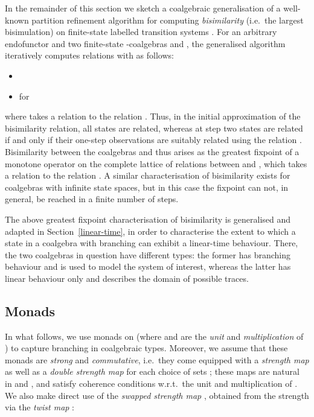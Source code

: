 \documentclass[submission,copyright,creativecommons]{eptcs}
\theoremstyle{plain}\newtheorem{theorem}{Theorem}[section]
\theoremstyle{remark}
\begin{document}
In the remainder of this section we sketch a coalgebraic generalisation of a well-known partition refinement algorithm for computing \emph{bisimilarity} (i.e.~the largest bisimulation) on finite-state labelled transition systems \cite{KS90}. For an arbitrary endofunctor  and two finite-state -coalgebras  and , the generalised algorithm iteratively computes relations  with  as follows:
\begin{itemize}
\item 
\item  for 
\end{itemize}
where  takes a relation  to the relation . Thus, in the initial approximation  of the bisimilarity relation, all states are related, whereas at step  two states are related if and only if their one-step observations are suitably related using the relation . Bisimilarity between the coalgebras  and  thus arises as the greatest fixpoint of a monotone operator on the complete lattice of relations between  and , which takes a relation  to the relation . A similar characterisation of bisimilarity exists for coalgebras with infinite state spaces, but in this case the fixpoint can not, in general, be reached in a finite number of steps.

The above greatest fixpoint characterisation of bisimilarity is generalised and adapted in Section~\ref{linear-time}, in order to characterise the extent to which a state in a coalgebra with branching can exhibit a linear-time behaviour. There, the two coalgebras in question have different types: the former has branching behaviour and is used to model the system of interest, whereas the latter has linear behaviour only and describes the domain of possible traces.

\subsection{Monads}

In what follows, we use monads  on  (where  and  are the \emph{unit} and \emph{multiplication} of ) to capture branching in coalgebraic types. Moreover, we assume that these monads are \emph{strong} and \emph{commutative}, i.e.~they come equipped with a \emph{strength map}  as well as a \emph{double strength map}  for each choice of sets ; these maps are natural in  and , and satisfy coherence conditions w.r.t.~the unit and multiplication of . We also make direct use of the \emph{swapped strength map} , obtained from the strength via the \emph{twist map} :
\end{document}
